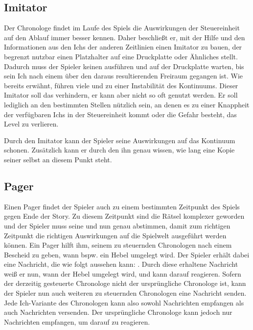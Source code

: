 \subsection{Imitator}\label{sec:concept_imitator}
Der Chronologe findet im Laufe des Spiels die Auswirkungen der Steuereinheit auf den Ablauf immer besser kennen. Daher beschließt er, mit der Hilfe und den Informationen aus den Ichs der anderen Zeitlinien einen Imitator zu bauen, der begrenzt nutzbar einen Platzhalter auf eine Druckplatte oder Ähnliches stellt. Dadurch muss der Spieler keinen  ausführen und auf der Druckplatte warten, bis sein Ich nach einem  über den daraus resultierenden Freiraum gegangen ist. Wie bereits erwähnt, führen viele  und  zu einer Instabilität des Kontinuums. Dieser Imitator soll das verhindern, er kann aber nicht so oft genutzt werden. Er soll lediglich an den bestimmten Stellen nützlich sein, an denen es zu einer Knappheit der verfügbaren Ichs in der Steuereinheit kommt oder die Gefahr besteht, das Level zu verlieren. 

Durch den Imitator kann der Spieler seine Auswirkungen auf das Kontinuum schonen. Zusätzlich kann er durch den ihn genau wissen, wie lang eine Kopie seiner selbst an diesem Punkt steht.

\subsection{Pager}
Einen Pager findet der Spieler auch zu einem bestimmten Zeitpunkt des Spiels gegen Ende der Story. Zu diesem Zeitpunkt sind die Rätsel komplexer geworden und der Spieler muss seine  und  nun genau abstimmen, damit zum richtigen Zeitpunkt die richtigen Auswirkungen auf die Spielwelt ausgeführt werden können. Ein Pager hilft ihm, seinem zu steuernden Chronologen nach einem  Bescheid zu geben, wann bspw. ein Hebel umgelegt wird. Der Spieler erhält dabei eine Nachricht, die wie folgt aussehen kann: . Durch diese erhaltene Nachricht weiß er nun, wann der Hebel umgelegt wird, und kann darauf reagieren. Sofern der derzeitig gesteuerte Chronologe nicht der ursprüngliche Chronologe ist, kann der Spieler nun auch weiteren zu steuernden Chronologen eine Nachricht senden. Jede Ich-Variante des Chronologen kann also sowohl Nachrichten empfangen als auch Nachrichten versenden. Der ursprüngliche Chronologe kann jedoch nur Nachrichten empfangen, um darauf zu reagieren.

